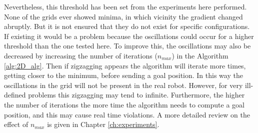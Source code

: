 Nevertheless, this threshold has been set from the experiments here performed. None of the grids ever showed minima, in which vicinity the gradient changed abruptly. But it is not ensured that they do not exist for specific configurations. If existing it would be a problem because the oscillations could occur for a higher threshold than the one tested here. To improve this, the oscillations may also be decreased by increasing the number of iterations ($n_{max}$) in the Algorithm \ref{alg:2D_alg}. Then if zigzagging appears the algorithm will iterate more times, getting closer to the minimum, before sending a goal position. In this way the oscillations in the grid will not be present in the real robot. However, for very ill-defined problems this zigzagging may tend to infinite. Furthermore, the higher the number of iterations the more time the algorithm needs to compute a goal position, and this may cause real time violations. A more detailed review on the effect of $n_{max}$ is given in Chapter \ref{ch:experiments}. 


